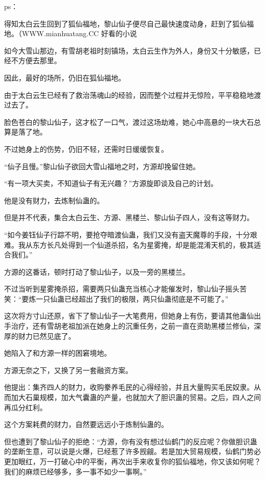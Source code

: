 
\begin{this_body}

ps：

得知太白云生回到了狐仙福地，黎山仙子便尽自己最快速度动身，赶到了狐仙福地。（WWW.mianhuatang.CC 好看的小说

如今大雪山那边，有雪胡老祖时刻镇场，太白云生作为外人，身份又十分敏感，已经不方便去那里。

因此，最好的场所，仍旧在狐仙福地。

由于太白云生已经有了救治荡魂山的经验，因而整个过程并无惊险，平平稳稳地渡过去了。

脸色苍白的黎山仙子，这才松了一口气，渡过这场劫难，她心中高悬的一块大石总算是落了地。

不过她身上的伤势，仍旧不轻，还需时日缓缓恢复。

“仙子且慢。”黎山仙子欲回大雪山福地之时，方源却挽留住她。

“有一项大买卖，不知道仙子有无兴趣？”方源旋即谈及自己的计划。

他是没有财力，去炼制仙蛊的。

但是并不代表，集合太白云生、方源、黑楼兰、黎山仙子四人，没有这等财力。

“如今姜钰仙子行踪不明，要抢夺暗渡仙蛊，我们又没有盗天魔尊的手段，十分艰难。我从东方长凡处得到一个仙道杀招，名为星雾掩，却是能混淆天机的，极其适合我们。”

方源的这番话，顿时打动了黎山仙子，以及一旁的黑楼兰。

不过当听到星雾掩杀招，需要两只仙蛊充当核心才能催发时，黎山仙子摇头苦笑：“要炼一只仙蛊已经超出了我们的极限，两只仙蛊彻底是不可能了。”

这次将方寸山还原，省下了黎山仙子一大笔费用，但她身上有伤，要请其他蛊仙出手治疗，还有雪胡老祖加派在她身上的沉重任务，之前一直在资助黑楼兰修仙，深厚的财力已然见底了。

她陷入了和方源一样的困窘境地。

方源无奈之下，又换了另一套融资方案。

他提出：集齐四人的财力，收购豢养毛民的心得经验，并且大量购买毛民奴隶。从而加大石巢规模，加大气囊蛊的产量，也就加大了胆识蛊的贸易。之后，四人之间再瓜分红利。

这个方案耗费的财力，自然要远远小于炼制仙蛊的。

但也遭到了黎山仙子的拒绝：“方源，你有没有想过仙鹤门的反应呢？你做胆识蛊的垄断生意，可以说是火爆，已经惹了许多觊觎。若是加大贸易规模，仙鹤门势必更加眼红，万一打破心中的平衡，再次出手来收复你的狐仙福地，你又该如何呢？我们的麻烦已经够多，多一事不如少一事啊。”


\end{this_body}
